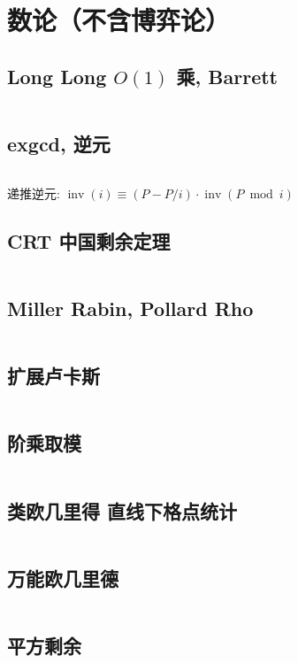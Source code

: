 \section{数论（不含博弈论）}
				\subsection{Long Long $O(1)$ 乘, Barrett}
					\inputminted{cpp}{src/Miscellany/LLFPM.cpp}
				\subsection{exgcd, 逆元}
					
					\inputminted{cpp}{src/Math/exgcd.cpp}
					递推逆元: $\operatorname{inv}(i) \equiv (P - P / i) \cdot \operatorname{inv}(P \bmod i)$
				\subsection{CRT 中国剩余定理}
					\inputminted{cpp}{src/Math/CRT_lbn.cpp}
				\subsection{Miller Rabin, Pollard Rho}
					\inputminted{cpp}{src/Math/Miller Rabin And Pollard Rho.cpp}
				\subsection{扩展卢卡斯}
					\inputminted{cpp}{src/Math/扩展卢卡斯.cpp}
				\subsection{阶乘取模}
					\inputminted{cpp}{src/Math/Factorial Mod.cpp}
				\subsection{类欧几里得 直线下格点统计}
					\inputminted{cpp}{src/Math/直线下格点统计.cpp}
				\subsection{万能欧几里德}
					\inputminted{cpp}{src/zjj/euclid.cpp}
				\subsection{平方剩余}
					\inputminted{cpp}{src/Math/平方剩余.cpp}

